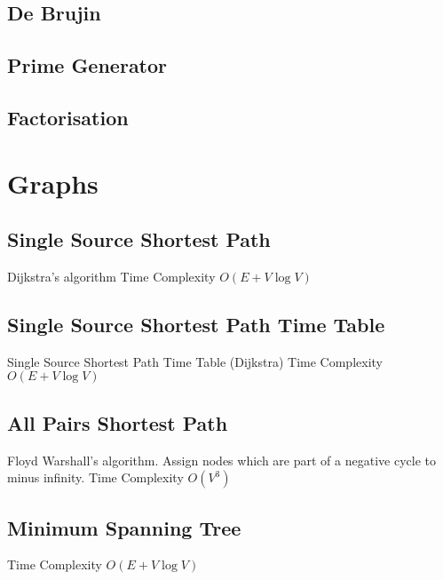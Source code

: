 \documentclass[a4paper]{article}
\begin{document}
\begin{multicols}{3}
\subsection{De Brujin}


\subsection{Prime Generator}


\subsection{Factorisation}



\section{Graphs}

\subsection{Single Source Shortest Path}
Dijkstra's algorithm \newline
Time Complexity $O(E + V\log V)$


\subsection{Single Source Shortest Path Time Table}
Single Source Shortest Path Time Table (Dijkstra)  \newline
Time Complexity $O(E + V\log V)$


\subsection{All Pairs Shortest Path}
Floyd Warshall's algorithm. Assign nodes which are part of a negative cycle to minus infinity. \newline
Time Complexity $O(V^3)$


\subsection{Minimum Spanning Tree}
Time Complexity $O(E + V\log V)$



\end{multicols}
\end{document}
